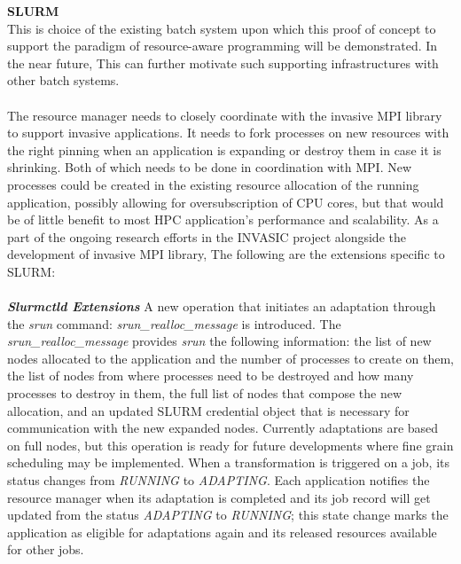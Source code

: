 \textbf{SLURM}\\
This is choice of the existing batch system upon which this proof of concept to support the paradigm of resource-aware programming will be demonstrated. In the near future, This can further motivate such supporting infrastructures with other batch systems.\\ \\
\noindent
The resource manager needs to closely coordinate with the invasive MPI library to support invasive applications. It needs to fork processes on new resources with the right pinning when an application is expanding or destroy them in case it is shrinking. Both of which needs to be done in coordination with MPI. New processes could be created in the existing resource allocation of the running application, possibly allowing for oversubscription of CPU cores, but that would be of little benefit to most HPC application's performance and scalability. As a part of the ongoing research efforts in the INVASIC project alongside the development of invasive MPI library, The following are the extensions specific to SLURM:\\ \\
\textbf{\textit{Slurmctld Extensions}} A new operation that initiates an adaptation through the \textit{srun} command: \textit{srun{\_}realloc{\_}message} is introduced. The \textit{srun{\_}realloc{\_}message} provides \textit{srun} the following information: the list of new nodes allocated to the application and the number of processes to create on them, the list of nodes from where processes need to be destroyed and how many processes to destroy in them, the full list of nodes that compose the new allocation, and an updated SLURM credential object that is necessary for communication with the new expanded nodes. Currently adaptations are based on full nodes, but this operation is ready for future developments where fine grain scheduling may be implemented. When a transformation is triggered on a job, its status changes from \textit{RUNNING} to \textit{ADAPTING}. Each application notifies the resource manager when its adaptation is completed and its job record will get updated from the status \textit{ADAPTING} to \textit{RUNNING}; this state change marks the application as eligible for adaptations again and its released resources available for other jobs.\\ \\
